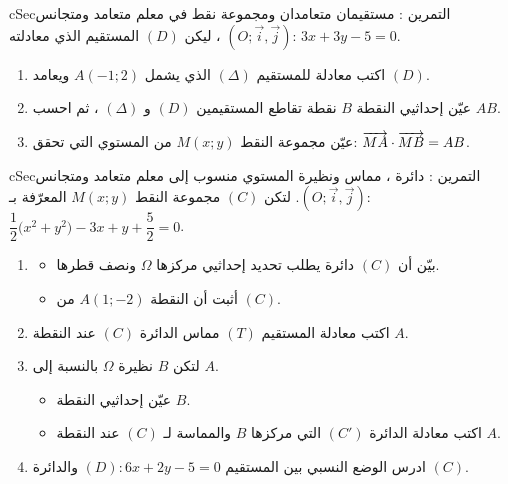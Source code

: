 \documentclass[12pt,a4paper]{article}
\newenvironment{BOX}[2]{\begin{otherlanguage}{english}\begin{arbox}{#1}{#2}}{\end{arbox}\end{otherlanguage}}
\newcounter{exo}
\newenvironment{tamrin}[1]{\stepcounter{exo}\begin{BOX}{cSec}{التمرين \theexo: #1}}{\end{BOX}}
\newenvironment{sq}{\begin{itemize}[leftmargin=2.4em,itemsep=3pt]}{\end{itemize}}
\newcommand{\qa}{\item[(أ)]}\newcommand{\qb}{\item[(ب)]}\newcommand{\qc}{\item[(جـ)]}\newcommand{\qd}{\item[(د)]}\newcommand{\qe}{\item[(هـ)]}
\begin{document}
\begin{tamrin}{مستقيمان متعامدان ومجموعة نقط}
في معلم متعامد ومتجانس $(O;\vec i,\vec j)$ ، ليكن $(D)$ المستقيم الذي معادلته: $3x+3y-5=0$.
\begin{enumerate}
\item اكتب معادلة للمستقيم $(\Delta)$ الذي يشمل $A(-1;2)$ ويعامد $(D)$.
\item عيّن إحداثيي النقطة $B$ نقطة تقاطع المستقيمين $(D)$ و $(\Delta)$ ، ثم احسب $AB$.
\item عيّن مجموعة النقط $M(x;y)$ من المستوي التي تحقق: $\overrightarrow{MA}\cdot\overrightarrow{MB}=AB$.
\end{enumerate}
\end{tamrin}

\begin{tamrin}{دائرة ، مماس ونظيرة}
المستوي منسوب إلى معلم متعامد ومتجانس $(O;\vec i,\vec j)$. لتكن $(C)$ مجموعة النقط $M(x;y)$ المعرّفة بـ: $\dfrac12\big(x^2+y^2\big)-3x+y+\dfrac52=0$.
\begin{enumerate}
\item
\begin{sq}
\qa بيّن أن $(C)$ دائرة يطلب تحديد إحداثيي مركزها $\Omega$ ونصف قطرها.
\qb أثبت أن النقطة $A(1;-2)$ من $(C)$.
\end{sq}
\item اكتب معادلة المستقيم $(T)$ مماس الدائرة $(C)$ عند النقطة $A$.
\item لتكن $B$ نظيرة $\Omega$ بالنسبة إلى $A$.
\begin{sq}
\qa عيّن إحداثيي النقطة $B$.
\qb اكتب معادلة الدائرة $(C')$ التي مركزها $B$ والمماسة لـ $(C)$ عند النقطة $A$.
\end{sq}
\item ادرس الوضع النسبي بين المستقيم $(D):6x+2y-5=0$ والدائرة $(C)$.
\end{enumerate}
\end{tamrin}
\end{document}

